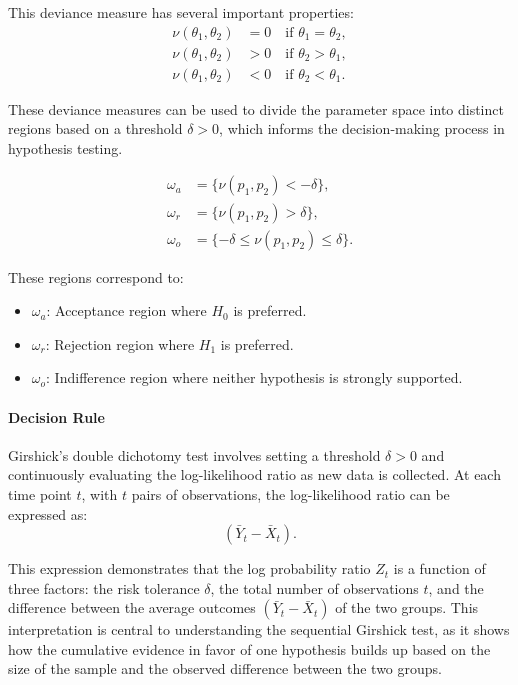 \documentclass[magisterska, english]{pwr_wmat_praca_dyplomowa}
\theoremstyle{plain}
\numberwithin{theorem}{chapter}
\theoremstyle{definition}
\numberwithin{theorem}{chapter}
\begin{document}
This deviance measure has several important properties:
\begin{align*}
	\nu(\theta_1, \theta_2) &= 0 \quad \text{if } \theta_1 = \theta_2, \\
	\nu(\theta_1, \theta_2) &> 0 \quad \text{if } \theta_2 > \theta_1, \\
	\nu(\theta_1, \theta_2) &< 0 \quad \text{if } \theta_2 < \theta_1.
\end{align*}


These deviance measures can be used to divide the parameter space into distinct regions based on a threshold \(\delta > 0\), which informs the decision-making process in hypothesis testing.

\begin{align*}
	\omega_a &= \{\nu(p_1, p_2) < -\delta\}, \\
	\omega_r &= \{\nu(p_1, p_2) > \delta\}, \\
	\omega_o &= \{-\delta \leq \nu(p_1, p_2) \leq \delta\}.
\end{align*}

These regions correspond to:
\begin{itemize}
	\item \(\omega_a\): Acceptance region where \(H_0\) is preferred.
	\item \(\omega_r\): Rejection region where \(H_1\) is preferred.
	\item \(\omega_o\): Indifference region where neither hypothesis is strongly supported.
\end{itemize}

\paragraph{Decision Rule}

Girshick’s double dichotomy test involves setting a threshold \(\delta > 0\) and continuously evaluating the log-likelihood ratio as new data is collected. At each time point \(t\), with \(t\) pairs of observations, the log-likelihood ratio can be expressed as:
\[
 (\bar{Y}_t - \bar{X}_t).
\]

This expression demonstrates that the log probability ratio \(Z_t\) is a function of three factors: the risk tolerance \(\delta\), the total number of observations \(t\), and the difference between the average outcomes \((\bar{Y}_t - \bar{X}_t)\) of the two groups. This interpretation is central to understanding the sequential Girshick test, as it shows how the cumulative evidence in favor of one hypothesis builds up based on the size of the sample and the observed difference between the two groups.
\end{document}
